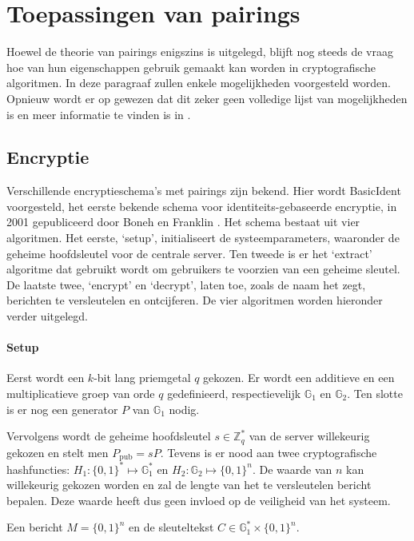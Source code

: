 \section{Toepassingen van pairings}

Hoewel de theorie van pairings enigszins is uitgelegd, blijft nog steeds de vraag hoe van hun eigenschappen gebruik gemaakt kan worden in cryptografische algoritmen. In deze paragraaf zullen enkele mogelijkheden voorgesteld worden. Opnieuw wordt er op gewezen dat dit zeker geen volledige lijst van mogelijkheden is en meer informatie te vinden is in \cite{maas}.

\subsection{Encryptie}

Verschillende encryptieschema's met pairings zijn bekend. Hier wordt BasicIdent voorgesteld, het eerste bekende schema voor identiteits-gebaseerde encryptie, in 2001 gepubliceerd door Boneh en Franklin \cite{boneh}. Het schema bestaat uit vier algoritmen. Het eerste, `setup', initialiseert de systeemparameters, waaronder de geheime hoofdsleutel voor de centrale server. Ten tweede is er het `extract' algoritme dat gebruikt wordt om gebruikers te voorzien van een geheime sleutel. De laatste twee, `encrypt' en `decrypt', laten toe, zoals de naam het zegt, berichten te versleutelen en ontcijferen. De vier algoritmen worden hieronder verder uitgelegd.

\paragraph{Setup} Eerst wordt een $k$-bit lang priemgetal $q$ gekozen. Er wordt een additieve en een multiplicatieve groep van orde $q$ gedefinieerd, respectievelijk $\mathbb{G}_1$ en  $\mathbb{G}_2$. Ten slotte is er nog een generator $P$ van $\mathbb{G}_1$ nodig.

Vervolgens wordt de geheime hoofdsleutel $s \in \mathbb{Z}^*_q$ van de server willekeurig gekozen en stelt men $P_{\text{pub}} = sP$. Tevens is er nood aan twee cryptografische hashfuncties: $H_1 : \{ 0,1 \}^* \mapsto \mathbb{G}_1^*$ en $H_2 : \mathbb{G}_2 \mapsto \{ 0, 1 \}^n$. De waarde van $n$ kan willekeurig gekozen worden en zal de lengte van het te versleutelen bericht bepalen. Deze waarde heeft dus geen invloed op de veiligheid van het systeem.

Een bericht $M = \{ 0,1 \}^n$ en de sleuteltekst $C \in \mathbb{G}_1^* \times \{ 0,1 \}^n$.

